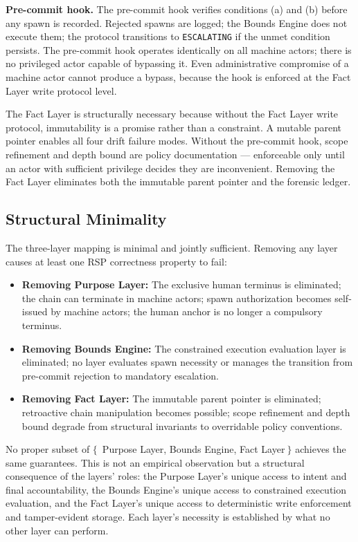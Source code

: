 \medskip
\noindent\textbf{Pre-commit hook.} The pre-commit hook verifies conditions (a) and (b) before any spawn is recorded. Rejected spawns are logged; the Bounds Engine does not execute them; the protocol transitions to \texttt{ESCALATING} if the unmet condition persists. The pre-commit hook operates identically on all machine actors; there is no privileged actor capable of bypassing it. Even administrative compromise of a machine actor cannot produce a bypass, because the hook is enforced at the Fact Layer write protocol level.

The Fact Layer is structurally necessary because without the Fact Layer write protocol, immutability is a promise rather than a constraint. A mutable parent pointer enables all four drift failure modes. Without the pre-commit hook, scope refinement and depth bound are policy documentation — enforceable only until an actor with sufficient privilege decides they are inconvenient. Removing the Fact Layer eliminates both the immutable parent pointer and the forensic ledger.

\subsection{Structural Minimality}
\label{sec:rs-minimality}

The three-layer mapping is minimal and jointly sufficient. Removing any layer causes at least one RSP correctness property to fail:

\begin{itemize}
  \item \textbf{Removing Purpose Layer:} The exclusive human terminus is eliminated; the chain can terminate in machine actors; spawn authorization becomes self-issued by machine actors; the human anchor is no longer a compulsory terminus.
  \item \textbf{Removing Bounds Engine:} The constrained execution evaluation layer is eliminated; no layer evaluates spawn necessity or manages the transition from pre-commit rejection to mandatory escalation.
  \item \textbf{Removing Fact Layer:} The immutable parent pointer is eliminated; retroactive chain manipulation becomes possible; scope refinement and depth bound degrade from structural invariants to overridable policy conventions.
\end{itemize}

No proper subset of $\{$\ Purpose Layer, Bounds Engine, Fact Layer$\ \}$ achieves the same guarantees. This is not an empirical observation but a structural consequence of the layers' roles: the Purpose Layer's unique access to intent and final accountability, the Bounds Engine's unique access to constrained execution evaluation, and the Fact Layer's unique access to deterministic write enforcement and tamper-evident storage. Each layer's necessity is established by what no other layer can perform.

